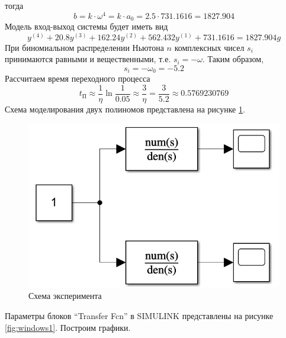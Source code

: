 \documentclass[a4paper, 12pt]{article}
\begin{document}
    тогда $$b=k\cdot\omega^4=k\cdot a_0=2.5\cdot731.1616=1827.904$$
    Модель вход-выход системы будет иметь вид
    $$
    y^{(4)}+20.8y^{(3)}+162.24y^{(2)}+562.432y^{(1)}+731.1616=1827.904g
    $$
    При биномиальном распределении Ньютона $n$ комплексных чисел $s_i$ принимаются
    равными и вещественными, т.е. $s_i=-\omega$. Таким образом, $$s_i=-\omega_0=-5.2$$
    Рассчитаем время переходного процесса
    $$t_{\text{П}}\approx\dfrac{1}{\eta}\ln{\dfrac{1}{0.05}}\approx\dfrac{3}{\eta}=\dfrac{3}{5.2}\approx0.5769230769$$
    Схема моделирования двух полиномов представлена на рисунке \ref{fig:scheme1}.
    \begin{figure}[H]
        \centering
        \includegraphics[scale=0.6]{scheme1.png}
        \captionsetup{skip=0pt}
        \caption{Схема эксперимента}
        \label{fig:scheme1}
    \end{figure}
    \noindent Параметры блоков ``Transfer Fcn'' в SIMULINK представлены на рисунке \ref{fig:windows1}. Построим графики.
\end{document}

